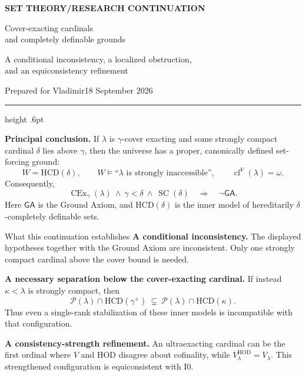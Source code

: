 \documentclass[11pt,letterpaper]{article}
\theoremstyle{definition}
\newcommand{\HOD}{\mathrm{HOD}}
\newcommand{\SC}{\operatorname{SC}}
\newcommand{\CEx}{\operatorname{CEx}}
\newcommand{\cf}{\operatorname{cf}}
\newcommand{\Izero}{\mathrm{I0}}
\newcommand{\HCD}{\mathrm{HCD}}
\newcommand{\GA}{\mathsf{GA}}
\newcommand{\Pow}{\mathcal{P}}
\begin{document}
\thispagestyle{empty}
{\sffamily\bfseries\small\color{Olive}SET THEORY\quad /\quad RESEARCH CONTINUATION}

\vspace{13pt}
{\fontsize{28}{31}\selectfont\bfseries\color{Forest}\raggedright Cover-exacting cardinals\\and completely definable grounds\par}
\vspace{10pt}
{\fontsize{14}{18}\selectfont \raggedright A conditional inconsistency, a localized obstruction,\\and an equiconsistency refinement\par}
\vspace{14pt}
{\color{Muted}Prepared for Vladimir\hfill 18 September 2026\par}
\vspace{3pt}
{\color{Sage}\hrule height .6pt}
\vspace{12pt}

\textbf{Principal conclusion.} If $\lambda$ is $\gamma$-cover exacting and some strongly compact cardinal $\delta$ lies above $\gamma$, then the universe has a proper, canonically defined set-forcing ground:
\[
  W=\HCD(\delta),\qquad
  W\models\text{``$\lambda$ is strongly inaccessible''},\qquad
  \cf^V(\lambda)=\omega.
\]
Consequently,
\[
 \boxed{\CEx_\gamma(\lambda)\ \wedge\ \gamma<\delta\ \wedge\ \SC(\delta)
        \quad\Longrightarrow\quad \neg\GA.}
\]
Here $\GA$ is the Ground Axiom, and $\HCD(\delta)$ is the inner model of hereditarily $\delta$-completely definable sets.

\begin{assessment}{What this continuation establishes}
\textbf{A conditional inconsistency.} The displayed hypotheses together with the Ground Axiom are inconsistent. Only one strongly compact cardinal above the cover bound is needed.

\textbf{A necessary separation below the cover-exacting cardinal.} If instead $\kappa<\lambda$ is strongly compact, then
\[
 \Pow(\lambda)\cap\HCD(\gamma^+)
 \ \subsetneq\ \Pow(\lambda)\cap\HCD(\kappa).
\]
Thus even a single-rank stabilization of these inner models is incompatible with that configuration.

\textbf{A consistency-strength refinement.} An ultraexacting cardinal can be the first ordinal where $V$ and HOD disagree about cofinality, while $V_\lambda^{\HOD}=V_\lambda$. This strengthened configuration is equiconsistent with $\Izero$.
\end{assessment}
\end{document}
